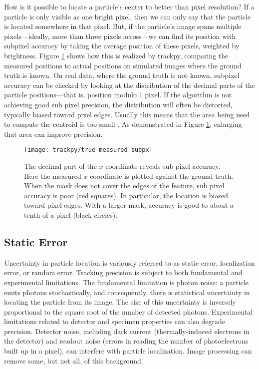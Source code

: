 How is it possible to locate a particle's center to better than pixel resolution? If a particle is only visible as one bright pixel, then we can only say that the particle is located somewhere in that pixel. But, if the particle's image spans multiple pixels---ideally, more than three pixels across---we can find its position with subpixel accuracy by taking the average position of these pixels, weighted by brightness. Figure \ref{fig:true-measured-subpx} shows how this is realized by trackpy, comparing the measured positions to actual positions on simulated images where the ground truth is known. On real data, where the ground truth is not known, subpixel accuracy can be checked by looking at the distribution of the decimal parts of the particle positions---that is, position modulo 1 pixel. If the algorithm is not achieving good sub pixel precision, the distribution will often be distorted, typically biased toward pixel edges. Usually this means that the area being used to compute the centroid is too small \cite{Crocker2007}. As demonstrated in Figure \ref{fig:true-measured-subpx}, enlarging that area can improve precision.

   \begin{figure}
    \centering
    \texttt{[image: trackpy/true-measured-subpx]}
    \caption[The decimal part of the $x$ coordinate reveals sub pixel accuracy. Here the measured $x$ coordinate is plotted against the ground truth.]{\label{fig:true-measured-subpx}The decimal part of the $x$ coordinate reveals sub pixel accuracy. Here the measured $x$ coordinate is plotted against the ground truth. When the mask does not cover the edges of the feature, sub pixel accuracy is poor (red squares). In particular, the location is biased toward pixel edges. With a larger mask, accuracy is good to about a tenth of a pixel (black circles).}
    \end{figure}

\subsection{Static Error}

Uncertainty in particle location is variously referred to as static error, localization error, or random error\cite{Savin2005,Martin2002a,Crocker1996}. Tracking precision is subject to both fundamental and experimental limitations. The fundamental limitation is photon noise: a particle emits photons stochastically, and consequently, there is statistical uncertainty in locating the particle from its image. The size of this uncertainty is inversely proportional to the square root of the number of detected photons\cite{Ober2004}. Experimental limitations related to detector and specimen properties can also degrade precision. Detector noise, including dark current (thermally-induced electrons in the detector) and readout noise (errors in reading the number of photoelectrons built up in a pixel), can interfere with particle localization\cite{Thompson2002,Deschout2012}. Image processing can remove some, but not all, of this background\cite{Deschout2014}.

